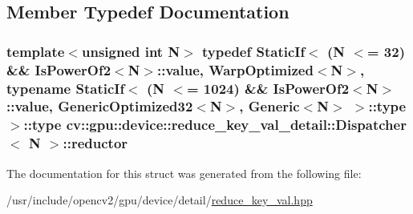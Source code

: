 \subsection{Member Typedef Documentation}
\hypertarget{structcv_1_1gpu_1_1device_1_1reduce__key__val__detail_1_1Dispatcher_abcfb41fcc1fbf4d0cc6d633b53d331f1}{
\subsubsection[{reductor}]{\setlength{\rightskip}{0pt plus 5cm}template$<$unsigned int N$>$ typedef {\bf Static\-If}$<$ (N $<$= 32) \&\& {\bf Is\-Power\-Of2}$<$N$>$\-::{\bf value}, {\bf Warp\-Optimized}$<$N$>$, typename {\bf Static\-If}$<$ (N $<$= 1024) \&\& {\bf Is\-Power\-Of2}$<$N$>$\-::{\bf value}, {\bf Generic\-Optimized32}$<$N$>$, {\bf Generic}$<$N$>$ $>$\-::{\bf type} $>$\-::{\bf type} {\bf cv\-::gpu\-::device\-::reduce\-\_\-key\-\_\-val\-\_\-detail\-::\-Dispatcher}$<$ N $>$\-::{\bf reductor}}}\label{structcv_1_1gpu_1_1device_1_1reduce__key__val__detail_1_1Dispatcher_abcfb41fcc1fbf4d0cc6d633b53d331f1}


The documentation for this struct was generated from the following file\-:\begin{DoxyCompactItemize}
\item 
/usr/include/opencv2/gpu/device/detail/\hyperlink{reduce__key__val_8hpp}{reduce\-\_\-key\-\_\-val.\-hpp}\end{DoxyCompactItemize}

